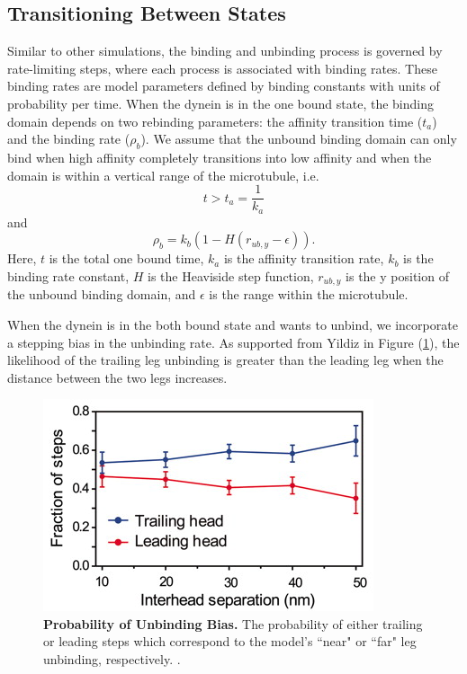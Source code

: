 \subsection{Transitioning Between States}

Similar to other simulations, the binding and unbinding process is governed by rate-limiting steps, where each process is associated with binding rates. These binding rates are model parameters defined by binding constants with units of probability per time. When the dynein is in the one bound state, the binding domain depends on two rebinding parameters: the affinity transition time ($t_a$) and the binding rate ($\rho_b$). We assume that the unbound binding domain can only bind when high affinity completely transitions into low affinity and when the domain is within a vertical range of the microtubule, i.e.
\begin{equation}
	t>t_a=\frac{1}{k_a}
\end{equation}
and
\begin{equation}
	\rho_b=k_b(1-H(r_{ub,y}-\epsilon)).
\end{equation} 
Here, $t$ is the total one bound time, $k_a$ is the affinity transition rate, $k_b$ is the binding rate constant, $H$ is the Heaviside step function, $r_{ub,y}$ is the y position of the unbound binding domain, and $\epsilon$ is the range within the microtubule.

When the dynein is in the both bound state and wants to unbind, we incorporate a stepping bias in the unbinding rate. As supported from Yildiz in Figure (\ref{fig:trailingbias}), the likelihood of the trailing leg unbinding is greater than the leading leg when the distance between the two legs increases. 


\begin{figure}[H]
	\centering
	\includegraphics[width=0.6\columnwidth]{Figures/trailingbias.png}
	\caption[Probability of Unbinding Bias]{\textbf{Probability of Unbinding Bias.} The probability of either trailing or leading steps which correspond to the model's ``near" or ``far" leg unbinding, respectively. \cite{Dewitt2012}.}
	\label{fig:trailingbias}
\end{figure}

